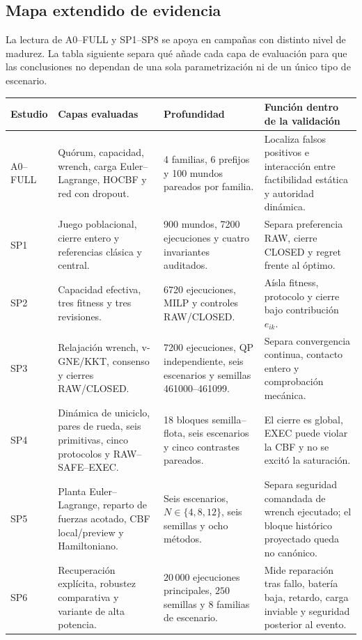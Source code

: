 

\subsection*{Mapa extendido de evidencia}

La lectura de A0--FULL y SP1--SP8 se apoya en campañas con distinto nivel de madurez. La tabla siguiente
separa qué añade cada capa de evaluación para que las conclusiones no dependan de una
sola parametrización ni de un único tipo de escenario.

\begin{table}[H]
\centering
\scriptsize
\begin{tabularx}{\textwidth}{@{}p{}p{}p{}X@{}}
\toprule
Estudio & Capas evaluadas & Profundidad & Función dentro de la validación \\
\midrule
A0--FULL & Quórum, capacidad, wrench, carga Euler--Lagrange, HOCBF y red con dropout. & 4 familias, 6 prefijos y 100 mundos pareados por familia. & Localiza falsos positivos e interacción entre factibilidad estática y autoridad dinámica. \\
SP1 & Juego poblacional, cierre entero y referencias clásica y central. & 900 mundos, 7200 ejecuciones y cuatro invariantes auditados. & Separa preferencia RAW, cierre CLOSED y regret frente al óptimo. \\
SP2 & Capacidad efectiva, tres fitness y tres revisiones. & 6720 ejecuciones, MILP y controles RAW/CLOSED. & Aísla fitness, protocolo y cierre bajo contribución $e_{ik}$. \\
SP3 & Relajación wrench, v-GNE/KKT, consenso y cierres RAW/CLOSED. & 7200 ejecuciones, QP independiente, seis escenarios y semillas 461000--461099. & Separa convergencia continua, contacto entero y comprobación mecánica. \\
SP4 & Dinámica de uniciclo, pares de rueda, seis primitivas, cinco protocolos y RAW--SAFE--EXEC. & 18 bloques semilla--flota, seis escenarios y cinco contrastes pareados. & El cierre es global, EXEC puede violar la CBF y no se excitó la saturación. \\
SP5 & Planta Euler--Lagrange, reparto de fuerzas acotado, CBF local/preview y Hamiltoniano. & Seis escenarios, $N\in\{4,8,12\}$, seis semillas y ocho métodos. & Separa seguridad comandada de wrench ejecutado; el bloque histórico proyectado queda no canónico. \\
SP6 & Recuperación explícita, robustez comparativa y variante de alta potencia. & $20\,000$ ejecuciones principales, $250$ semillas y $8$ familias de escenario. & Mide reparación tras fallo, batería baja, retardo, carga inviable y seguridad posterior al evento. \\

\end{tabularx}
\end{table}
